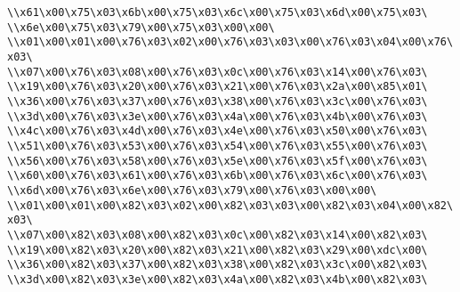 \verb|\\x61\x00\x75\x03\x6b\x00\x75\x03\x6c\x00\x75\x03\x6d\x00\x75\x03\|\newline
\verb|\\x6e\x00\x75\x03\x79\x00\x75\x03\x00\x00\|\newline
\verb|\\x01\x00\x01\x00\x76\x03\x02\x00\x76\x03\x03\x00\x76\x03\x04\x00\x76\x03\|\newline
\verb|\\x07\x00\x76\x03\x08\x00\x76\x03\x0c\x00\x76\x03\x14\x00\x76\x03\|\newline
\verb|\\x19\x00\x76\x03\x20\x00\x76\x03\x21\x00\x76\x03\x2a\x00\x85\x01\|\newline
\verb|\\x36\x00\x76\x03\x37\x00\x76\x03\x38\x00\x76\x03\x3c\x00\x76\x03\|\newline
\verb|\\x3d\x00\x76\x03\x3e\x00\x76\x03\x4a\x00\x76\x03\x4b\x00\x76\x03\|\newline
\verb|\\x4c\x00\x76\x03\x4d\x00\x76\x03\x4e\x00\x76\x03\x50\x00\x76\x03\|\newline
\verb|\\x51\x00\x76\x03\x53\x00\x76\x03\x54\x00\x76\x03\x55\x00\x76\x03\|\newline
\verb|\\x56\x00\x76\x03\x58\x00\x76\x03\x5e\x00\x76\x03\x5f\x00\x76\x03\|\newline
\verb|\\x60\x00\x76\x03\x61\x00\x76\x03\x6b\x00\x76\x03\x6c\x00\x76\x03\|\newline
\verb|\\x6d\x00\x76\x03\x6e\x00\x76\x03\x79\x00\x76\x03\x00\x00\|\newline
\verb|\\x01\x00\x01\x00\x82\x03\x02\x00\x82\x03\x03\x00\x82\x03\x04\x00\x82\x03\|\newline
\verb|\\x07\x00\x82\x03\x08\x00\x82\x03\x0c\x00\x82\x03\x14\x00\x82\x03\|\newline
\verb|\\x19\x00\x82\x03\x20\x00\x82\x03\x21\x00\x82\x03\x29\x00\xdc\x00\|\newline
\verb|\\x36\x00\x82\x03\x37\x00\x82\x03\x38\x00\x82\x03\x3c\x00\x82\x03\|\newline
\verb|\\x3d\x00\x82\x03\x3e\x00\x82\x03\x4a\x00\x82\x03\x4b\x00\x82\x03\|\newline
